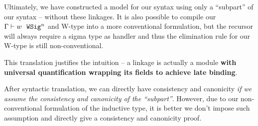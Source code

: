 Ultimately, we have constructed a model for our syntax using only a
``subpart'' of our syntax -- without these linkages. It is also
possible to compile our $ {\Gamma} \vdash {w} \ \ \texttt{WSig}^{n} $ and W-type into a more
conventional formulation, but the recursor will always require a sigma
type as handler and thus the elimination rule for our W-type is still
non-conventional.

This translation justifies the intuition -- a linkage is actually a
module \textbf{with universal quantification wrapping its fields to
achieve late binding}. 

After syntactic translation, we can directly have consistency and
canonicity \textit{if we assume the consistency and canonicity of the
``subpart''}. However, due to our non-conventional formulation of the
inductive type, it is better we don't impose such assumption and
directly give a consistency and canonicity proof.


